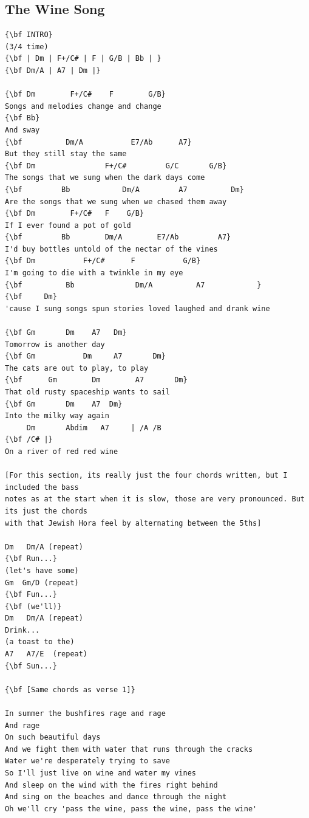 \documentclass[a4paper]{article}
\begin{document}
\subsection{The Wine Song} %
\label{sub:The Wine Song}
\begin{Verbatim}[commandchars=\\\{\}]
{\bf INTRO}
(3/4 time)
{\bf | Dm | F+/C# | F | G/B | Bb | }
{\bf Dm/A | A7 | Dm |}

{\bf Dm        F+/C#    F        G/B}
Songs and melodies change and change
{\bf Bb}
And sway
{\bf          Dm/A           E7/Ab      A7}
But they still stay the same
{\bf Dm                F+/C#         G/C       G/B}
The songs that we sung when the dark days come
{\bf         Bb            Dm/A         A7          Dm}
Are the songs that we sung when we chased them away
{\bf Dm        F+/C#   F    G/B}
If I ever found a pot of gold
{\bf         Bb        Dm/A        E7/Ab         A7}
I'd buy bottles untold of the nectar of the vines
{\bf Dm           F+/C#      F           G/B}
I'm going to die with a twinkle in my eye
{\bf          Bb              Dm/A          A7            }
{\bf     Dm}
'cause I sung songs spun stories loved laughed and drank wine

{\bf Gm       Dm    A7   Dm}
Tomorrow is another day
{\bf Gm           Dm     A7       Dm}
The cats are out to play, to play
{\bf      Gm        Dm        A7       Dm}
That old rusty spaceship wants to sail
{\bf Gm       Dm    A7  Dm}
Into the milky way again
     Dm       Abdim   A7     | /A /B 
{\bf /C# |}
On a river of red red wine

[For this section, its really just the four chords written, but I included the bass 
notes as at the start when it is slow, those are very pronounced. But its just the chords 
with that Jewish Hora feel by alternating between the 5ths]

Dm   Dm/A (repeat)
{\bf Run...}
(let's have some)
Gm  Gm/D (repeat)
{\bf Fun...}
{\bf (we'll)}
Dm   Dm/A (repeat)
Drink...
(a toast to the)
A7   A7/E  (repeat)
{\bf Sun...}

{\bf [Same chords as verse 1]}

In summer the bushfires rage and rage
And rage
On such beautiful days
And we fight them with water that runs through the cracks
Water we're desperately trying to save
So I'll just live on wine and water my vines
And sleep on the wind with the fires right behind
And sing on the beaches and dance through the night
Oh we'll cry 'pass the wine, pass the wine, pass the wine'


\end{Verbatim}
\end{document}
